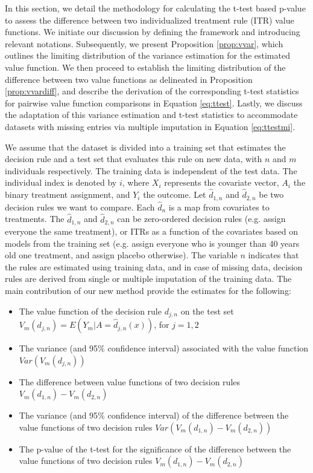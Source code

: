 \documentclass{article}
\begin{document}
In this section, we detail the methodology for calculating the t-test based p-value to assess the difference between two individualized treatment rule (ITR) value functions. We initiate our discussion by defining the framework and introducing relevant notations. Subsequently, we present Proposition \ref{prop:vvar}, which outlines the limiting distribution of the variance estimation for the estimated value function. We then proceed to establish the limiting distribution of the difference between two value functions as delineated in Proposition \ref{prop:vvardiff}, and describe the derivation of the corresponding t-test statistics for pairwise value function comparisons in Equation \ref{eq:ttest}. Lastly, we discuss the adaptation of this variance estimation and t-test statistics to accommodate datasets with missing entries via multiple imputation in Equation \ref{eq:ttestmi}.

We assume that the dataset is divided into a training set that estimates the decision rule and a test set that evaluates this rule on new data, with $n$ and $m$ individuals respectively. The training data is independent of the test data. The individual index is denoted by $i$, where $X_i$ represents the covariate vector, $A_i$ the binary treatment assignment, and $Y_i$ the outcome. Let $\hat{d}_{1,n}$ and $\hat{d}_{2,n}$ be two decision rules we want to compare. Each $\hat{d}_n$ is a map from covariates to treatments. The $\hat{d}_{1,n}$ and $\hat{d}_{2,n}$ can be zero-ordered decision rules (e.g. assign everyone the same treatment), or ITRs as a function of the covariates based on models from the training set (e.g. assign everyone who is younger than 40 years old one treatment, and assign placebo otherwise). The variable $n$ indicates that the rules are estimated using training data, and in case of missing data, decision rules are derived from single or multiple imputation of the training data. The main contribution of our new method provide the estimates for the following: 
 

\begin{itemize}
\item The value function of the decision rule $d_{j,n}$ on the test set $V_{m}(d_{j,n})=E(Y_{m}|A=\hat{d}_{j,n}(x))$, for $j =1,2$
    \item  The variance (and 95\% confidence interval) associated with the value function $Var(V_{m}(d_{j,n}))$
    \item The difference between value functions of two decision rules $V_{m}(d_{1,n})-V_{m}(d_{2,n})$
    \item The variance (and 95\% confidence interval) of the difference between the value functions of two decision rules $Var(V_{m}(d_{1,n})-V_{m}(d_{2,n}))$
    \item The p-value of the t-test for the significance of the difference between the value functions of two decision rules $V_{m}(d_{1,n})-V_{m}(d_{2,n})$
\end{itemize}
\end{document}
